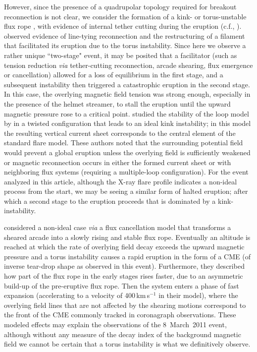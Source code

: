 \documentclass[namedreferences]{solarphysics}
\begin{document}
\begin{article}
However, since the presence of a quadrupolar topology required for breakout reconnection is not clear, we consider the formation of a kink- or torus-unstable flux rope \cite{2004A&A...413L..27T,2010ApJ...708..314A}, with evidence of internal tether cutting during the eruption (c.f., ).  observed evidence of line-tying reconnection and the restructuring of a filament that facilitated its eruption due to the torus instability. Since here we observe a rather unique ``two-stage" event, it may be posited that a facilitator (such as tension reduction \emph{via} tether-cutting reconnection, arcade shearing, flux emergence or cancellation) allowed for a loss of equilibrium in the first stage, and a subsequent instability then triggered a catastrophic eruption in the second stage. In this case, the overlying magnetic field tension was strong enough, especially in the presence of the helmet streamer, to stall the eruption until the upward magnetic pressure rose to a critical point.  studied the stability of the loop model by  in a twisted configuration that leads to an ideal kink instability; in this model the resulting vertical current sheet corresponds to the central element of the standard flare model. These authors noted that the surrounding potential field would prevent a global eruption unless the overlying field is sufficiently weakened or magnetic reconnection occurs in either the formed current sheet or with neighboring flux systems (requiring a multiple-loop configuration). For the event analyzed in this article, although the X-ray flare profile indicates a non-ideal process from the start, we may be seeing a similar form of halted eruption; after which a second stage to the eruption proceeds that is dominated by a kink-instability.

 considered a non-ideal case \emph{via} a flux cancellation model that transforms a sheared arcade into a slowly rising and stable flux rope. Eventually an altitude is reached at which the rate of overlying field decay exceeds the upward magnetic pressure and a torus instability causes a rapid eruption in the form of a CME (of inverse tear-drop shape as observed in this event). Furthermore, they described how part of the flux rope in the early stages rises faster, due to an asymmetric build-up of the pre-eruptive flux rope. Then the system enters a phase of fast expansion (accelerating to a velocity of 400\,km\,s$^{-1}$ in their model), where the overlying field lines that are not affected by the shearing motions correspond to the front of the CME commonly tracked in coronagraph observations. These modeled effects may explain the observations of the 8~March~2011 event, although without any measure of the decay index of the background magnetic field we cannot be certain that a torus instability is what we definitively observe.



\end{article}
\end{document}
